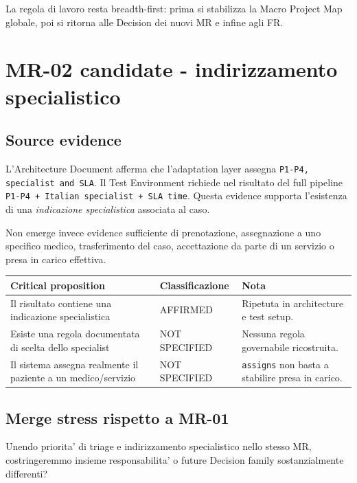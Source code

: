 \documentclass[11pt,a4paper]{article}
\begin{document}
La regola di lavoro resta breadth-first: prima si stabilizza la Macro Project Map globale, poi si ritorna alle Decision dei nuovi MR e infine agli FR.

\section{MR-02 candidate - indirizzamento specialistico}

\subsection{Source evidence}

L'Architecture Document afferma che l'adaptation layer assegna \texttt{P1-P4, specialist and SLA}. Il Test Environment richiede nel risultato del full pipeline \texttt{P1-P4 + Italian specialist + SLA time}. Questa evidence supporta l'esistenza di una \emph{indicazione specialistica} associata al caso.

Non emerge invece evidence sufficiente di prenotazione, assegnazione a uno specifico medico, trasferimento del caso, accettazione da parte di un servizio o presa in carico effettiva.

\begin{tabularx}{\textwidth}{L{64mm}L{35mm}Y}
\toprule
\textbf{Critical proposition} & \textbf{Classificazione} & \textbf{Nota} \\
\midrule
Il risultato contiene una indicazione specialistica & AFFIRMED & Ripetuta in architecture e test setup. \\
Esiste una regola documentata di scelta dello specialist & NOT SPECIFIED & Nessuna regola governabile ricostruita. \\
Il sistema assegna realmente il paziente a un medico/servizio & NOT SPECIFIED & \texttt{assigns} non basta a stabilire presa in carico. \\
\bottomrule
\end{tabularx}

\subsection{Merge stress rispetto a MR-01}

\begin{ddtacheck}[title={Domanda}]
Unendo priorita' di triage e indirizzamento specialistico nello stesso MR, costringeremmo insieme responsabilita' o future Decision family sostanzialmente differenti?
\end{ddtacheck}
\end{document}
